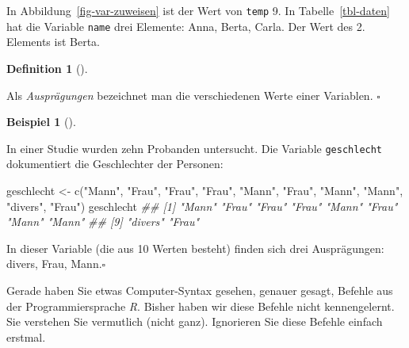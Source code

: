 \documentclass[
  a4paper,
  DIV=11]{scrreprt}
\newenvironment{Shaded}{\begin{snugshade}}{\end{snugshade}}
\newcommand{\DocumentationTok}[1]{\textcolor[rgb]{0.37,0.37,0.37}{\textit{#1}}}
\newcommand{\FunctionTok}[1]{\textcolor[rgb]{0.28,0.35,0.67}{#1}}
\newcommand{\NormalTok}[1]{\textcolor[rgb]{0.00,0.23,0.31}{#1}}
\newcommand{\OtherTok}[1]{\textcolor[rgb]{0.00,0.23,0.31}{#1}}
\newcommand{\StringTok}[1]{\textcolor[rgb]{0.13,0.47,0.30}{#1}}
\theoremstyle{definition}
\theoremstyle{definition}
\newtheorem{example}{Beispiel}[chapter]
\theoremstyle{definition}
\newtheorem{definition}{Definition}[chapter]
\theoremstyle{remark}
\begin{document}
In Abbildung~\ref{fig-var-zuweisen} ist der Wert von \texttt{temp} 9. In
Tabelle~\ref{tbl-daten} hat die Variable \texttt{name} drei Elemente:
Anna, Berta, Carla. Der Wert des 2. Elements ist Berta.

\begin{definition}[]\protect\hypertarget{def-auspraegung}{}\label{def-auspraegung}

Als \emph{Ausprägungen} bezeichnet man die verschiedenen Werte einer
Variablen. \(\square\)

\end{definition}

\begin{example}[]\protect\hypertarget{exm-geschlecht}{}\label{exm-geschlecht}

In einer Studie wurden zehn Probanden untersucht. Die Variable
\texttt{geschlecht} dokumentiert die Geschlechter der Personen:

\begin{Shaded}
\begin{Highlighting}[]
\NormalTok{geschlecht }\OtherTok{\textless{}{-}} \FunctionTok{c}\NormalTok{(}\StringTok{"Mann"}\NormalTok{, }\StringTok{"Frau"}\NormalTok{, }\StringTok{"Frau"}\NormalTok{, }\StringTok{"Frau"}\NormalTok{, }\StringTok{"Mann"}\NormalTok{,}
                \StringTok{"Frau"}\NormalTok{, }\StringTok{"Mann"}\NormalTok{, }\StringTok{"Mann"}\NormalTok{, }\StringTok{"divers"}\NormalTok{, }\StringTok{"Frau"}\NormalTok{)}
\NormalTok{geschlecht}
\DocumentationTok{\#\#  [1] "Mann"   "Frau"   "Frau"   "Frau"   "Mann"   "Frau"   "Mann"   "Mann"  }
\DocumentationTok{\#\#  [9] "divers" "Frau"}
\end{Highlighting}
\end{Shaded}

In dieser Variable (die aus 10 Werten besteht) finden sich drei
Ausprägungen: divers, Frau, Mann.\(\square\)

\end{example}

\begin{tcolorbox}[enhanced jigsaw, toptitle=1mm, rightrule=.15mm, colbacktitle=quarto-callout-tip-color!10!white, breakable, title=\textcolor{quarto-callout-tip-color}{\faLightbulb}\hspace{0.5em}{Tipp}, bottomrule=.15mm, colback=white, opacitybacktitle=0.6, left=2mm, titlerule=0mm, toprule=.15mm, coltitle=black, opacityback=0, bottomtitle=1mm, arc=.35mm, leftrule=.75mm, colframe=quarto-callout-tip-color-frame]

Gerade haben Sie etwas Computer-Syntax gesehen, genauer gesagt, Befehle
aus der Programmiersprache \emph{R}. Bisher haben wir diese Befehle
nicht kennengelernt. Sie verstehen Sie vermutlich (nicht ganz).
Ignorieren Sie diese Befehle einfach erstmal.

\end{tcolorbox}
\end{document}
